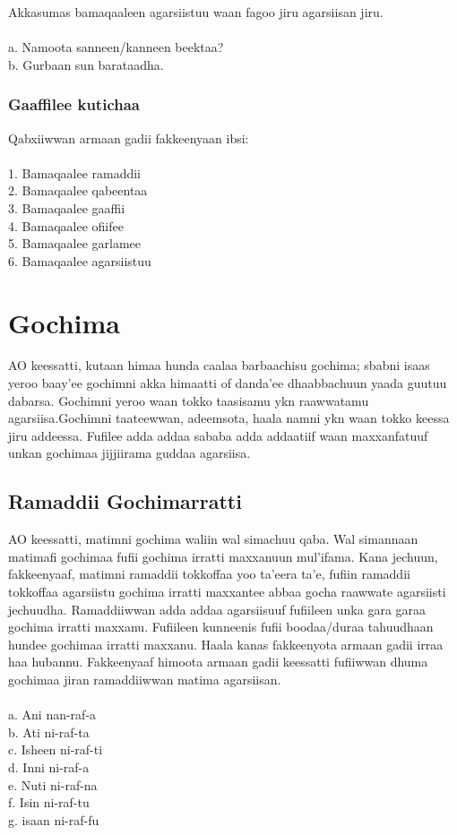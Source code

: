 \documentclass[11pt,b5paper]{book}
\begin{document}
Akkasumas bamaqaaleen agarsiistuu waan fagoo jiru agarsiisan
jiru. \\
\\
a. Namoota sanneen/kanneen beektaa?\\
b. Gurbaan sun barataadha.

\subsubsection{Gaaffilee kutichaa}
Qabxiiwwan armaan gadii fakkeenyaan ibsi:\\
\\
1. Bamaqaalee ramaddii\\
2. Bamaqaalee qabeentaa\\
3. Bamaqaalee gaaffii\\
4. Bamaqaalee ofiifee\\
5. Bamaqaalee garlamee\\
6. Bamaqaalee agarsiistuu

\newpage
\section{Gochima}
AO keessatti, kutaan himaa hunda caalaa barbaachisu
gochima; sbabni isaas yeroo baay'ee gochimni akka himaatti of danda’ee dhaabbachuun yaada guutuu dabarsa. Gochimni
yeroo waan tokko taasisamu ykn raawwatamu agarsiisa.Gochimni taateewwan, adeemsota, haala namni ykn waan tokko keessa jiru addeessa. Fufilee adda addaa sababa adda addaatiif waan maxxanfatuuf unkan gochimaa jijjiirama guddaa
agarsiisa.

\subsection{Ramaddii Gochimarratti}
AO keessatti, matimni gochima waliin wal simachuu qaba. Wal simannaan matimafi gochimaa fufii gochima irratti maxxanuun mul'ifama. Kana jechuun, fakkeenyaaf, matimni ramaddii tokkoffaa yoo ta'eera ta'e, fufiin ramaddii tokkoffaa agarsiistu gochima irratti maxxantee abbaa gocha raawwate agarsiisti jechuudha. Ramaddiiwwan adda addaa agarsiisuuf fufiileen unka gara garaa gochima irratti maxxanu. Fufiileen kunneenis fufii boodaa/duraa tahuudhaan hundee gochimaa irratti maxxanu. Haala kanas fakkeenyota armaan gadii irraa haa hubannu. Fakkeenyaaf himoota armaan gadii keessatti fufiiwwan dhuma gochimaa jiran ramaddiiwwan matima agarsiisan. \\
\\
a. Ani nan-raf-a\\
b. Ati ni-raf-ta\\
c. Isheen ni-raf-ti\\
d. Inni ni-raf-a\\
e. Nuti ni-raf-na\\
f. Isin ni-raf-tu\\
g. isaan ni-raf-fu
\end{document}
